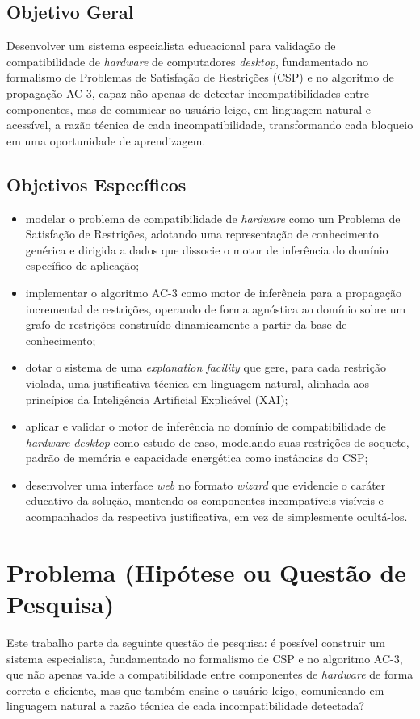 \subsection{Objetivo Geral}
Desenvolver um sistema especialista educacional para validação de compatibilidade de \textit{hardware} de computadores \textit{desktop},
fundamentado no formalismo de Problemas de Satisfação de Restrições (CSP) e no algoritmo de propagação AC-3, capaz não apenas de detectar
incompatibilidades entre componentes, mas de comunicar ao usuário leigo, em linguagem natural e acessível, a razão técnica de cada
incompatibilidade, transformando cada bloqueio em uma oportunidade de aprendizagem.

\subsection{Objetivos Específicos}
\begin{itemize}
  \item modelar o problema de compatibilidade de \textit{hardware} como um Problema de Satisfação de Restrições, adotando uma representação
        de conhecimento genérica e dirigida a dados que dissocie o motor de inferência do domínio específico de aplicação;
  \item implementar o algoritmo AC-3 como motor de inferência para a propagação incremental de restrições, operando de forma agnóstica ao
        domínio sobre um grafo de restrições construído dinamicamente a partir da base de conhecimento;
  \item dotar o sistema de uma \textit{explanation facility} que gere, para cada restrição violada, uma justificativa técnica em linguagem
        natural, alinhada aos princípios da Inteligência Artificial Explicável (XAI);
  \item aplicar e validar o motor de inferência no domínio de compatibilidade de \textit{hardware} \textit{desktop} como estudo de caso,
        modelando suas restrições de soquete, padrão de memória e capacidade energética como instâncias do CSP;
  \item desenvolver uma interface \textit{web} no formato \textit{wizard} que evidencie o caráter educativo da solução, mantendo os
        componentes incompatíveis visíveis e acompanhados da respectiva justificativa, em vez de simplesmente ocultá-los.
\end{itemize}

\section{Problema (Hipótese ou Questão de Pesquisa)}
Este trabalho parte da seguinte questão de pesquisa: é possível construir um sistema especialista, fundamentado no formalismo de CSP e no
algoritmo AC-3, que não apenas valide a compatibilidade entre componentes de \textit{hardware} de forma correta e eficiente, mas que também
ensine o usuário leigo, comunicando em linguagem natural a razão técnica de cada incompatibilidade detectada?

